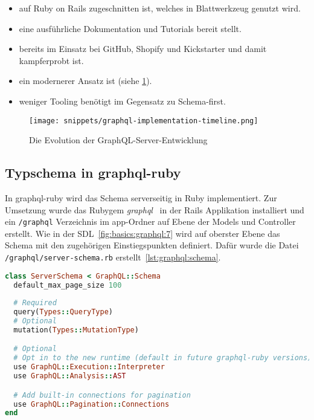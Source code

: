 \begin{description}
\begin{itemize}
	\setlength\itemsep{-1em}
	\item auf Ruby on Rails zugeschnitten ist, welches in Blattwerkzeug genutzt wird.
	\item eine ausführliche Dokumentation und Tutorials bereit stellt.
	\item bereits im Einsatz bei GitHub, Shopify und Kickstarter und damit kampferprobt ist.
	\item ein modernerer Ansatz ist (siehe \ref{graphql:evolution}).
	\item weniger Tooling benötigt im Gegensatz zu Schema-first.

\end{itemize}
\end{description}

\begin{figure}[h!]
	\centering
	\texttt{[image: snippets/graphql-implementation-timeline.png]}
	\caption{Die Evolution der GraphQL-Server-Entwicklung ~\cite{graphql-evolution-graphic}}
	\label{graphql:evolution}
\end{figure}

\subsection{Typschema in graphql-ruby}
In graphql-ruby wird das Schema serverseitig in Ruby implementiert.
Zur Umsetzung wurde das Rubygem \emph{graphql}~\cite{graphql-rubygem} in der Rails Applikation installiert und ein \lstinline|/graphql| Verzeichnis im app-Ordner auf Ebene der Models und Controller erstellt. Wie in der SDL~\ref{fig:basics:graphql:7} wird auf oberster Ebene das Schema mit den zugehörigen Einstiegspunkten definiert. Dafür wurde die Datei \lstinline|/graphql/server-schema.rb| erstellt~\ref{lst:graphql:schema}.

\begin{lstlisting}[language=Ruby,float=h!,caption={graphql-ruby Schema Definition und Festlegung der Einstiegpunkte query und mutation}, label={lst:graphql:schema}]
class ServerSchema < GraphQL::Schema
  default_max_page_size 100
  
  # Required
  query(Types::QueryType)
  # Optional
  mutation(Types::MutationType)

  # Optional
  # Opt in to the new runtime (default in future graphql-ruby versions)
  use GraphQL::Execution::Interpreter
  use GraphQL::Analysis::AST

  # Add built-in connections for pagination
  use GraphQL::Pagination::Connections
end
\end{lstlisting}

